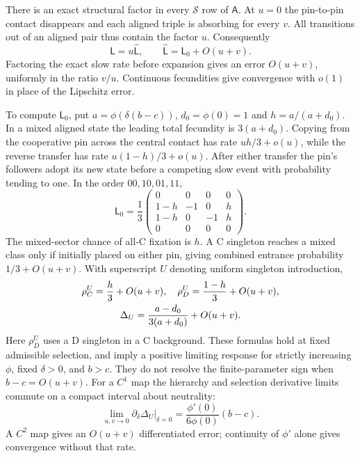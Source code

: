 \documentclass[aps,pre,reprint,amsmath,amssymb,longbibliography]{revtex4-2}
\begin{document}
There is an exact structural factor in every $\mathcal S$ row of
$\mathsf A$. At $u=0$ the pin-to-pin contact disappears and each
aligned triple is absorbing for every $v$. All transitions out of an
aligned pair thus contain the factor $u$. Consequently
\begin{equation}
 \mathsf L=u\widehat{\mathsf L},\qquad
 \widehat{\mathsf L}=\mathsf L_0+O(u+v).
 \label{eq:app-p6-uniform-factor}
\end{equation}
Factoring the exact slow rate before expansion gives an error $O(u+v)$,
uniformly in the ratio $v/u$. Continuous fecundities give convergence
with $o(1)$ in place of the Lipschitz error.

To compute $\mathsf L_0$, put
$a=\phi(\delta(b-c))$, $d_0=\phi(0)=1$ and $h=a/(a+d_0)$. In a mixed
aligned state the leading total fecundity is $3(a+d_0)$. Copying from
the cooperative pin across the central contact has rate
$uh/3+o(u)$, while the reverse transfer has rate $u(1-h)/3+o(u)$.
After either transfer the pin's followers adopt its new state before
a competing slow event with probability tending to one. In the order
$00,10,01,11$,
\begin{equation}
 \mathsf L_0=\frac13
 \begin{pmatrix}
 0&0&0&0\\
 1-h&-1&0&h\\
 1-h&0&-1&h\\
 0&0&0&0
 \end{pmatrix}.
 \label{eq:app-p6-selected-generator}
\end{equation}
The mixed-sector chance of all-C fixation is $h$. A C singleton
reaches a mixed class only if initially placed on either pin, giving
combined entrance probability $1/3+O(u+v)$. With superscript $U$
denoting uniform singleton introduction,
\begin{gather}
 \rho_C^U=\frac h3+O(u+v), \quad 
 \rho_D^U=\frac{1-h}{3}+O(u+v),\notag\\
 \Delta_U=\frac{a-d_0}{3(a+d_0)}+O(u+v).
 \label{eq:app-p6-selected-law}
\end{gather}
Here $\rho_D^U$ uses a D singleton in a C background. These formulas
hold at fixed admissible selection, and imply a positive limiting
response for strictly increasing $\phi$, fixed $\delta>0$, and
$b>c$. They do not resolve the finite-parameter sign when
$b-c=O(u+v)$. For a $C^1$ map the hierarchy and selection derivative
limits commute on a compact interval about neutrality:
\begin{equation}
 \lim_{u,v\to0}\left.\partial_\delta\Delta_U\right|_{\delta=0}
 =\frac{\phi'(0)}{6\phi(0)}(b-c).
\end{equation}
A $C^2$ map gives an $O(u+v)$ differentiated error; continuity of
$\phi'$ alone gives convergence without that rate.
\end{document}
